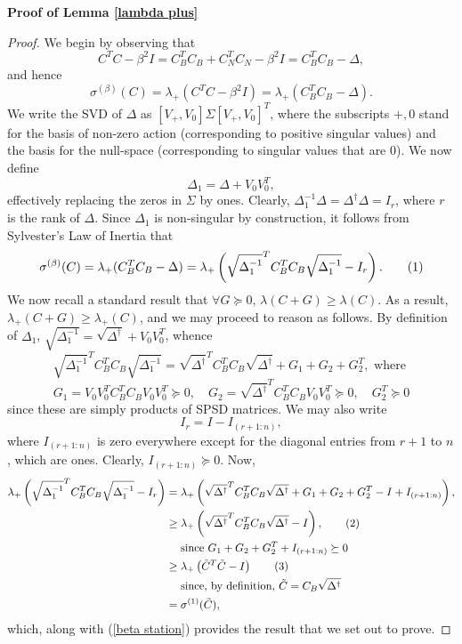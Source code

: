 \documentclass[11pt]{article}
\newcommand{\Geq}{\succeq}
\newcommand\numberthis{\addtocounter{equation}{1}\tag{\theequation}}
\begin{document}
%
\noindent \textbf{Proof of Lemma \ref{lambda plus}}
%
\begin{proof}
We begin by observing that
\[ C^T C - \beta^2 I  = C_B ^T C_B + C_N ^T C_N - \beta^2 I = C_B ^T C_B  - \Delta, \]
and hence
\[ \sigma^{(\beta)} (C) = \lambda_+ \left( C^T C - \beta^2 I \right) = \lambda_+ \left( C_B ^T C_B  - \Delta \right). \]
We write the SVD of $\Delta$ as $[V_+, V_0] \Sigma [V_+, V_0]^T$, where the subscripts $+, 0$ stand for the basis of non-zero action (corresponding to positive singular values) and the basis for the null-space (corresponding to singular values that are 0). We now define 
\[ \Delta_1 = \Delta + V_0 V_0 ^T, \]
effectively replacing the zeros in $\Sigma$ by ones. Clearly, $\Delta_1 ^{-1} \Delta = \Delta^{\dagger} \Delta = I_r$, where $r$ is the rank of $\Delta$. Since $\Delta_1$ is non-singular by construction, it follows from Sylvester's Law of Inertia that
\[ \sigma^{(\beta)} (C) = \lambda_+ (C_B ^T C_B  - \Delta) = \lambda_+ \left( \sqrt{\Delta_1 ^{-1}} ^T C_B ^T C_B \sqrt{\Delta_1 ^{-1}} - I_r  \right) . \numberthis \label{beta station} \]
We now recall a standard result that $\forall G \Geq 0$, $\lambda(C + G) \geq \lambda(C)$. As a result, $\lambda_+ (C+G) \geq \lambda_+ (C)$, and we may proceed to reason as follows. By definition of $\Delta_1$, $\sqrt{\Delta_1^{-1}} = \sqrt{\Delta^{\dagger}} + V_0 V_0 ^T$, whence 
\[ \sqrt{ \Delta_1 ^{-1} } ^T C_B ^T C_B \sqrt{ \Delta_1 ^{-1}}  = \sqrt{\Delta^{\dagger}}^T C_B ^T C_B \sqrt{\Delta^{\dagger}} + G_1 + G_2 + G_2 ^T, \text{ where } \]
\[ G_1 = V_0 V_0 ^T C_B ^T C_B V_0 V_0 ^T \Geq 0, \quad  G_2 = \sqrt{\Delta^{\dagger}}^T C_B ^T C_B V_0 V_0 ^T \Geq 0, \quad  G_2 ^T \Geq 0 \] 
since these are simply products of SPSD matrices. We may also write 
\[ I_r = I - I_{(r+1 : n)}, \]
where $I_{(r+1 : n)}$ is zero everywhere except for the diagonal entries from $r+1$ to $n$, which are ones. Clearly, $I_{(r+1: n)} \Geq 0$. Now, 
\begin{align*}
\lambda_+ \left( \sqrt{ \Delta_1 ^{-1} } ^T C_B ^T C_B \sqrt{ \Delta_1 ^{-1} } - I_r \right)  &= \lambda_+ \left( \sqrt{\Delta^{\dagger}}^T C_B ^T C_B \sqrt{\Delta^{\dagger}} + G_1 + G_2 + G_2 ^T - I + I_{(r+1 : n)} \right),  \\
& \geq \lambda_+ \left( \sqrt{\Delta^{\dagger}}^T C_B ^T C_B \sqrt{\Delta^{\dagger}}  - I \right),  \numberthis \label{p2inv}\\ 
& \quad \text{ since } G_1 + G_2 + G_2 ^T + I_{(r+1 : n)} \Geq 0 \\
& \geq \lambda_+ \left( \tilde{C} ^T \tilde{C} - I \right) \numberthis \label{p2inv2} \\
& \quad \text{ since, by definition, } \tilde{C} = C_B \sqrt{\Delta ^{\dagger}} \\
& = \sigma^{(1)}(\tilde C), 
\end{align*}
which, along with (\ref{beta station}) provides the result that we set out to prove.
\end{proof}
\end{document}
